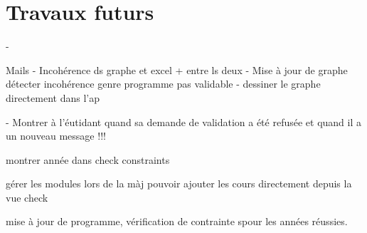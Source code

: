 \chapter{Travaux futurs}
\label{futur_work}
- 

Mails
- Incohérence ds graphe et excel + entre ls deux
- Mise à jour de graphe
détecter incohérence genre programme pas validable
- dessiner le graphe directement dans l'ap

- Montrer à l'éutidant quand sa demande de validation a été refusée et quand il a un nouveau message !!!

montrer année dans check constraints

gérer les modules lors de la màj
pouvoir ajouter les cours directement depuis la vue check

mise à jour de programme, vérification de contrainte spour les années réussies. 
